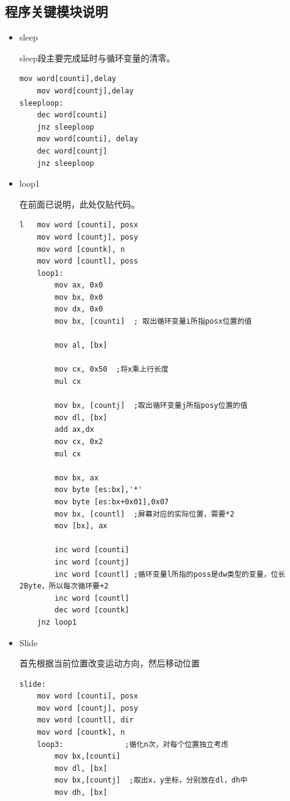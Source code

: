 \documentclass[a4paper,11pt,UTF8]{ctexart}
\begin{document}
\subsection{程序关键模块说明}
	\begin{itemize}
		\item sleep
		
		sleep段主要完成延时与循环变量的清零。
			\begin{lstlisting}[caption={stone.asm sleeploop段},tabsize=4,basicstyle=\footnotesize,captionpos=b]
	mov word[counti],delay
	mov word[countj],delay
sleeploop:
	dec word[counti]
	jnz sleeploop
	mov word[counti], delay
	dec word[countj]
	jnz sleeploop

			\end{lstlisting}

	
		\item loop1
		
		在前面已说明，此处仅贴代码。
		\begin{lstlisting}[caption={stone\_v0.asm loop1段}, basicstyle=\footnotesize,tabsize=4,captionpos=b]
l	mov word [counti], posx
	mov word [countj], posy
	mov word [countk], n
	mov word [countl], poss
	loop1:
		mov ax, 0x0
		mov bx, 0x0
		mov dx, 0x0
		mov bx, [counti]  ; 取出循环变量i所指posx位置的值

		mov al, [bx]

		mov cx, 0x50  ;将x乘上行长度
		mul cx

		mov bx, [countj]  ;取出循环变量j所指posy位置的值
		mov dl, [bx]
		add ax,dx
		mov cx, 0x2
		mul cx

		mov bx, ax
		mov byte [es:bx],'*'
		mov byte [es:bx+0x01],0x07
		mov bx, [countl]  ;屏幕对应的实际位置，需要*2
		mov [bx], ax

		inc word [counti]
		inc word [countj]
		inc word [countl] ;循环变量l所指的poss是dw类型的变量，位长2Byte，所以每次循环要+2
		inc word [countl]
		dec word [countk]
	jnz loop1

		\end{lstlisting}
	
	\item Slide
	
	首先根据当前位置改变运动方向，然后移动位置
	
	\begin{lstlisting}[caption={stone.asm slide段},tabsize=4,basicstyle=\footnotesize,captionpos=b]
slide:
	mov word [counti], posx
	mov word [countj], posy
	mov word [countl], dir
	mov word [countk], n
	loop3: 				;循化n次，对每个位置独立考虑
		mov bx,[counti]
		mov dl, [bx]
		mov bx,[countj]  ;取出x，y坐标，分别放在dl，dh中
		mov dh, [bx]


\end{lstlisting}
\end{itemize}
\end{document}
